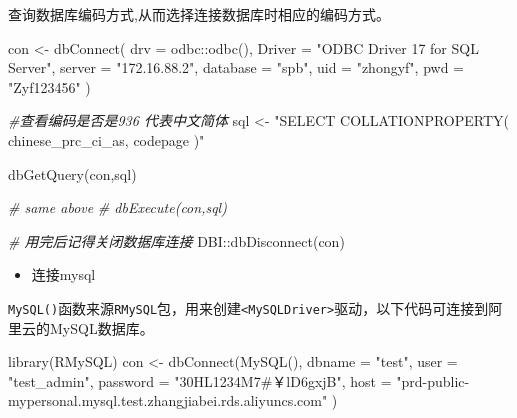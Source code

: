 \documentclass[
]{book}
\newenvironment{Shaded}{\begin{snugshade}}{\end{snugshade}}
\newcommand{\AttributeTok}[1]{\textcolor[rgb]{0.77,0.63,0.00}{#1}}
\newcommand{\CommentTok}[1]{\textcolor[rgb]{0.56,0.35,0.01}{\textit{#1}}}
\newcommand{\FunctionTok}[1]{\textcolor[rgb]{0.00,0.00,0.00}{#1}}
\newcommand{\NormalTok}[1]{#1}
\newcommand{\OtherTok}[1]{\textcolor[rgb]{0.56,0.35,0.01}{#1}}
\newcommand{\SpecialCharTok}[1]{\textcolor[rgb]{0.00,0.00,0.00}{#1}}
\newcommand{\StringTok}[1]{\textcolor[rgb]{0.31,0.60,0.02}{#1}}
\providecommand{\tightlist}{%
  \setlength{\itemsep}{0pt}\setlength{\parskip}{0pt}}
\begin{document}
查询数据库编码方式,从而选择连接数据库时相应的编码方式。

\begin{Shaded}
\begin{Highlighting}[]
\NormalTok{con }\OtherTok{\textless{}{-}} \FunctionTok{dbConnect}\NormalTok{(}
  \AttributeTok{drv =}\NormalTok{ odbc}\SpecialCharTok{::}\FunctionTok{odbc}\NormalTok{(), }\AttributeTok{Driver =} \StringTok{"ODBC Driver 17 for SQL Server"}\NormalTok{,}
  \AttributeTok{server =} \StringTok{"172.16.88.2"}\NormalTok{, }\AttributeTok{database =} \StringTok{"spb"}\NormalTok{, }\AttributeTok{uid =} \StringTok{"zhongyf"}\NormalTok{, }\AttributeTok{pwd =} \StringTok{"Zyf123456"}
\NormalTok{)}

\CommentTok{\#查看编码是否是936 代表中文简体}
\NormalTok{sql }\OtherTok{\textless{}{-}} \StringTok{"SELECT COLLATIONPROPERTY( \textquotesingle{}chinese\_prc\_ci\_as\textquotesingle{}, \textquotesingle{}codepage\textquotesingle{} )"}

\FunctionTok{dbGetQuery}\NormalTok{(con,sql)}

\CommentTok{\# same above}
\CommentTok{\# dbExecute(con,sql)}

\CommentTok{\# 用完后记得关闭数据库连接}
\NormalTok{DBI}\SpecialCharTok{::}\FunctionTok{dbDisconnect}\NormalTok{(con)}
\end{Highlighting}
\end{Shaded}

\begin{itemize}
\tightlist
\item
  连接mysql
\end{itemize}

\texttt{MySQL()}函数来源\texttt{RMySQL}包，用来创建\texttt{\textless{}MySQLDriver\textgreater{}}驱动，以下代码可连接到阿里云的MySQL数据库。

\begin{Shaded}
\begin{Highlighting}[]
\FunctionTok{library}\NormalTok{(RMySQL)}
\NormalTok{con }\OtherTok{\textless{}{-}} \FunctionTok{dbConnect}\NormalTok{(}\FunctionTok{MySQL}\NormalTok{(),}
  \AttributeTok{dbname =} \StringTok{"test"}\NormalTok{, }\AttributeTok{user =} \StringTok{"test\_admin"}\NormalTok{, }\AttributeTok{password =} \StringTok{"30HL1234M7\#￥lD6gxjB"}\NormalTok{,}
  \AttributeTok{host =} \StringTok{"prd{-}public{-}mypersonal.mysql.test.zhangjiabei.rds.aliyuncs.com"}
\NormalTok{)}
\end{Highlighting}
\end{Shaded}
\end{document}
